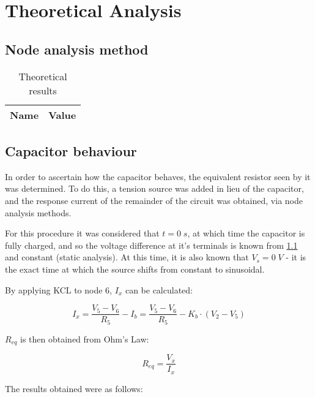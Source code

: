 \section{Theoretical Analysis}
\label{sec:analysis}

\subsection{Node analysis method}
\label{sec:node}

\begin{table}[H]
  \centering
  \begin{tabular}{|c|c|}
    \hline
        {\bf Name} & {\bf Value} \\
        \hline
        \hline
        
        \hline
  \end{tabular}
  \caption{Theoretical results}
  \label{mesh_res}
\end{table}

\subsection{Capacitor behaviour}
\label{sec:Req}

In order to ascertain how the capacitor behaves, the equivalent resistor seen by it was determined. To do this, a tension source was added in lieu of the capacitor, and the response current of the remainder of the circuit was obtained, via node analysis methods.

For this procedure it was considered that $t=0\;s$, at which time the capacitor is fully charged, and so the voltage difference at it's terminals is known from \ref{sec:node} and constant (static analysis). At this time, it is also known that $V_s=0\;V$ - it is the exact time at which the source shifts from constant to sinusoidal.


By applying KCL to node 6, $I_x$ can be calculated:

\begin{equation}
  I_x = \frac{V_5-V_6}{R_5}-I_b = \frac{V_5-V_6}{R_5} - K_b \cdot (V_2-V_5)
\end{equation}

$R_{eq}$ is then obtained from Ohm's Law:

\begin{equation}
  R_{eq} = \frac{V_x}{I_x}
\end{equation}

The results obtained were as follows:


